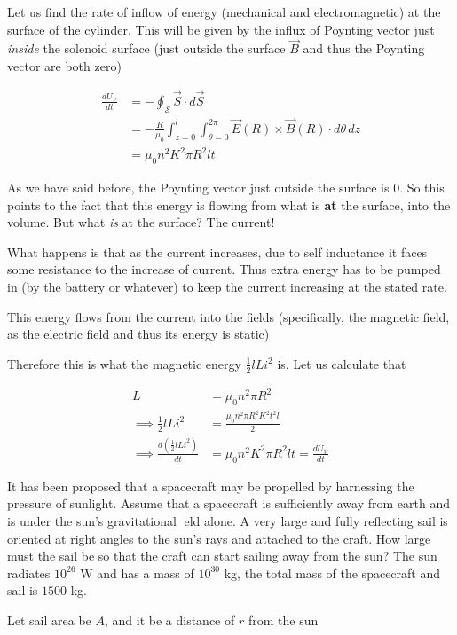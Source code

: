 \documentclass[../main.tex]{subfiles}
\begin{document}
\begin{questions}
\begin{parts}
	\begin{solution}
		Let us find the rate of inflow of energy (mechanical and electromagnetic) at the surface of the cylinder. This will be given by the influx of Poynting vector just \textit{inside} the solenoid surface (just outside the surface $\vec{B}$ and thus the Poynting vector are both zero)

		\begin{align}
			\frac{dU_\mathcal{V}}{dt} &= -\oint_{\mathcal{S}} \vec{S} \cdot d\vec{S}
			\\
			&= -\frac{R}{\mu_0}\int_{z=0}^{l}\int_{\theta=0}^{2\pi} \vec{E}(R) \times\vec{B}(R) \cdot d\theta\,dz
			\\
			&= \mu_0n^2K^2\pi R^2lt
		\end{align}

		As we have said before, the Poynting vector just outside the surface is $0$. So this points to the fact that this energy is flowing from what is \textbf{at} the surface, into the volume. But what \textit{is} at the surface? The current!

		What happens is that as the current increases, due to self inductance it faces some resistance to the increase of current. Thus extra energy has to be pumped in (by the battery or whatever) to keep the current increasing at the stated rate. 

		This energy flows from the current into the fields (specifically, the magnetic field, as the electric field and thus its energy is static)

		Therefore this is what the magnetic energy $\frac{1}{2}lLi^2$ is. Let us calculate that
		
		\begin{align}
			L &= \mu_0 n^2\pi R^2\\
			\implies \frac{1}{2}lLi^2 &= \frac{\mu_0 n^2\pi R^2 K^2t^2l}{2}\\
			\implies \frac{d(\frac{1}{2}lLi^2)}{dt} &= \mu_0n^2K^2\pi R^2lt = \frac{dU_\mathcal{V}}{dt}
		\end{align}
	\end{solution}
\end{parts}

\question It has been proposed that a spacecraft may be propelled by harnessing the pressure of sunlight. Assume that a spacecraft is sufficiently away from earth and is under the sun's gravitational eld alone. A very large and fully reflecting sail is oriented at right angles to the sun's rays and attached to the craft. How large must the sail be so that the craft can start sailing away from the sun? The sun radiates $10^{26}$ W and has a mass of $10^{30}$ kg, the total mass of the spacecraft and sail is $1500$ kg.
\begin{solution}
	Let sail area be $A$, and it be a distance of $r$ from the sun


\end{solution}
\end{questions}
\end{document}
